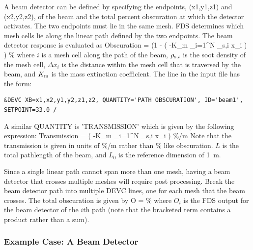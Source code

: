 \documentclass[11pt]{book}
\begin{document}
A beam detector can be defined by specifying the endpoints, {\ct (x1,y1,z1) and (x2,y2,z2)}, of the beam and the
total percent obscuration at which the detector activates.  The two endpoints must lie in the same mesh.  FDS determines which mesh
cells lie along the linear path defined by the two endpoints.  The beam detector response is evaluated as
\be
  \hbox{Obscuration}  = \left(1 - \exp \left( -K_{\rm m} \sum_{i=1}^N {\rho_{{\rm s},i}\; \Delta x_i} \right)  \right)   \; \; \hbox{\%}
\ee
where $i$ is a mesh cell along the path of the beam, $\rho_{{\rm s},i}$ is the soot density of the mesh cell, $ \Delta x_i$
is the distance within the mesh cell that is traversed by the beam, and $K_{\rm m}$ is the mass extinction coefficient. The line in the input file has the form:
\begin{lstlisting}
&DEVC XB=x1,x2,y1,y2,z1,z2, QUANTITY='PATH OBSCURATION', ID='beam1', SETPOINT=33.0 /
\end{lstlisting}
A similar {\ct QUANTITY} is {\ct 'TRANSMISSION'} which is given by the following expression:
\be
  \hbox{Transmission}  = \exp \left( -K_{\rm m}  \sum_{i=1}^N {\rho_{{\rm s},i}\; \Delta x_i} \right)    \; \; \hbox{\%/m}
\ee
Note that the transmission is given in units of \%/m rather than \% like obscuration. $L$ is the total pathlength of the beam, and $L_0$ is the reference dimension of 1~m.

Since a single linear path cannot span more than one mesh, having a beam detector that crosses multiple meshes will require post processing.
Break the beam detector path into multiple {\ct DEVC} lines, one for each mesh that the beam crosses.  The total obscuration is given by
\be
  O  = \left[ 1 -  \prod_{i=1}^N \left( 1-O_i/100 \right)  \right]   \; \hbox{\%}
\ee
where $O_i$ is the FDS output for the beam detector of the $i$th path (note that the bracketed term contains a product rather than a sum).

\subsubsection{Example Case: A Beam Detector}
\end{document}
